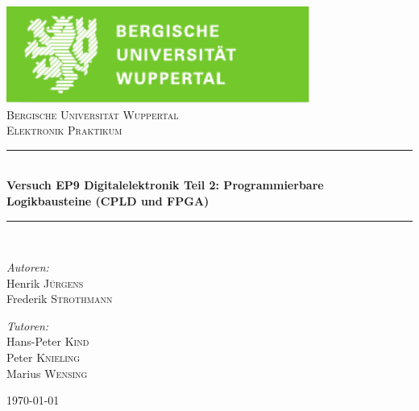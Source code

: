 \documentclass[12pt,a4paper]{article}
\begin{document}


\begin{titlepage}

\begin{center}
\includegraphics[width=0.75\textwidth]{logo.pdf}\\[1cm]    	%

\textsc{\LARGE Bergische Universität Wuppertal}\\[1.5cm]	%

\textsc{\Large Elektronik Praktikum}\\[0.5cm]				%


\newcommand{\HRule}{\rule{\linewidth}{0.5mm}}
\HRule \\[0.4cm]
{ \huge \bfseries Versuch EP9 Digitalelektronik Teil 2: Programmierbare Logikbausteine (CPLD und FPGA)}\\[0.4cm]				%

\HRule \\[1.5cm]

\begin{minipage}{0.4\textwidth}
\begin{flushleft} \large
\emph{Autoren:}\\
Henrik \textsc{Jürgens} \\
Frederik \textsc{Strothmann}
\end{flushleft}
\end{minipage}
\hfill
\begin{minipage}{0.4\textwidth}
\begin{flushright} \large
\emph{Tutoren:} \\
Hans-Peter \textsc{Kind} \\
Peter \textsc{Knieling} \\
Marius \textsc{Wensing}
\end{flushright}
\end{minipage}

\vfill

{\large \today}

\end{center}

\end{titlepage}
\end{document}
